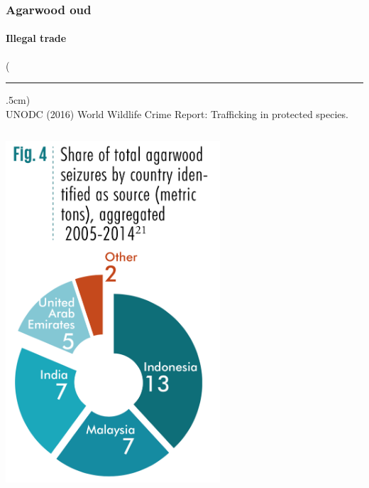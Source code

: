 \documentclass[10pt]{beamer}
\newenvironment{reference}[2]{%
	\begin{textblock*}{\textwidth}(#1,#2)
		\tiny\bgroup\color{gray}}{\egroup\end{textblock*}}
\begin{document}
\begin{frame}[t]
\frametitle{Agarwood oud}
\framesubtitle{Illegal trade}
\vspace{0.5cm}

	\begin{reference}{4mm}{92mm}
		\rule{1.5cm}{0.25pt}\\
		UNODC (2016) World Wildlife Crime Report: Trafficking in protected species.
	\end{reference}

	\begin{columns}
		\begin{column}{0.5\textwidth}
			\begin{center}
				\includegraphics[width=0.6\textwidth]{figures/agarwood_illegal_export.png}
			\end{center}
		\end{column}
		

\end{columns}
\end{frame}
\end{document}
